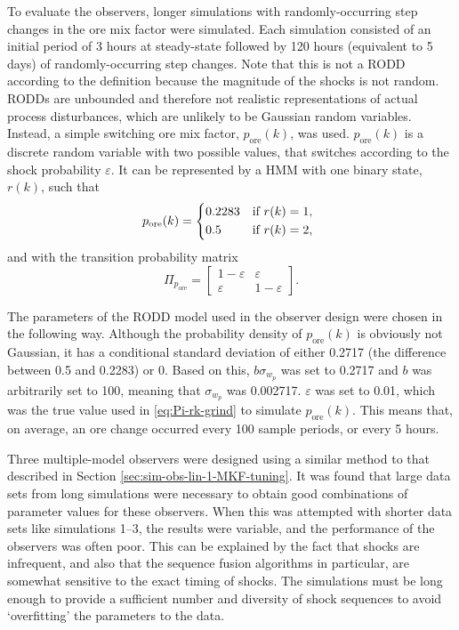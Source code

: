 To evaluate the observers, longer simulations with randomly-occurring step changes in the ore mix factor were simulated. Each simulation consisted of an initial period of 3 hours at steady-state followed by 120 hours (equivalent to 5 days) of randomly-occurring step changes. Note that this is not a \gls{RODD} according to the definition because the magnitude of the shocks is not random. \gls{RODD}s are unbounded and therefore not realistic representations of actual process disturbances, which are unlikely to be Gaussian random variables. Instead, a simple switching ore mix factor, $p_\text{ore}(k)$, was used. $p_\text{ore}(k)$ is a discrete random variable with two possible values, that switches according to the shock probability $\varepsilon$. It can be represented by a \gls{HMM} with one binary state, $r(k)$, such that
%
\begin{equation} \label{eq:pk-grind}
	p_\text{ore}(k) = \begin{cases*}
		0.2283 & if $r(k)=1$, \\
		0.5 & if $r(k)=2$,
	\end{cases*} \\
\end{equation}
and with the transition probability matrix
\begin{equation} \label{eq:Pi-rk-grind}
	\Pi_{p_\text{ore}} = \begin{bmatrix}
		1-\varepsilon & \varepsilon \\
		\varepsilon & 1-\varepsilon
	\end{bmatrix}.
\end{equation}

The parameters of the \gls{RODD} model used in the observer design were chosen in the following way. Although the probability density of $p_\text{ore}(k)$ is obviously not Gaussian, it has a conditional standard deviation of either 0.2717 (the difference between 0.5 and 0.2283) or 0. Based on this, $b\sigma_{w_p}$ was set to 0.2717 and $b$ was arbitrarily set to 100, meaning that $\sigma_{w_p}$ was 0.002717. $\varepsilon$ was set to 0.01, which was the true value used in \eqref{eq:Pi-rk-grind} to simulate $p_\text{ore}(k)$. This means that, on average, an ore change occurred every 100 sample periods, or every 5 hours.

Three multiple-model observers were designed using a similar method to that described in Section \ref{sec:sim-obs-lin-1-MKF-tuning}. It was found that large data sets from long simulations were necessary to obtain good combinations of parameter values for these observers. When this was attempted with shorter data sets like simulations 1--3, the results were variable, and the performance of the observers was often poor. This can be explained by the fact that shocks are infrequent, and also that the sequence fusion algorithms in particular, are somewhat sensitive to the exact timing of shocks. The simulations must be long enough to provide a sufficient number and diversity of shock sequences to avoid `overfitting' the parameters to the data.

